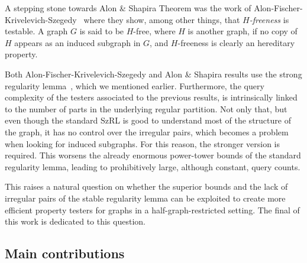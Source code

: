         A stepping stone towards Alon \& Shapira Theorem was the work of
        Alon-Fischer-Krivelevich-Szegedy~\cite{efficient_testing_of_large_graphs} where they show, among other things,
        that \emph{$H$-freeness} is testable.
        A graph $G$ is said to be $H$-free, where $H$ is another graph, if no copy of $H$ appears as an induced subgraph in
        $G$, and $H$-freeness is clearly an hereditary property.

        Both Alon-Fischer-Krivelevich-Szegedy and Alon \& Shapira results use the strong regularity
        lemma~\cite[Lemma 4.1]{efficient_testing_of_large_graphs}, which we mentioned earlier.
        Furthermore, the query complexity of the testers associated to the previous results, is intrinsically linked to the number of
        parts in the underlying regular partition.
        Not only that, but even though the standard SzRL is good to understand most of the structure of the graph,
        it has no control over the irregular pairs, which becomes a problem when looking for induced subgraphs.
        For this reason, the stronger version is required.
        This worsens the already enormous power-tower bounds of the standard regularity lemma, leading to prohibitively large,
        although constant, query counts.

        This raises a natural question on whether the superior bounds and the lack of irregular pairs of the stable regularity
        lemma can be exploited to create more efficient property testers for graphs in a half-graph-restricted setting.
        The final of this work is dedicated to this question.

    \subsection{Main contributions} \label{subsec:main_contributions}

